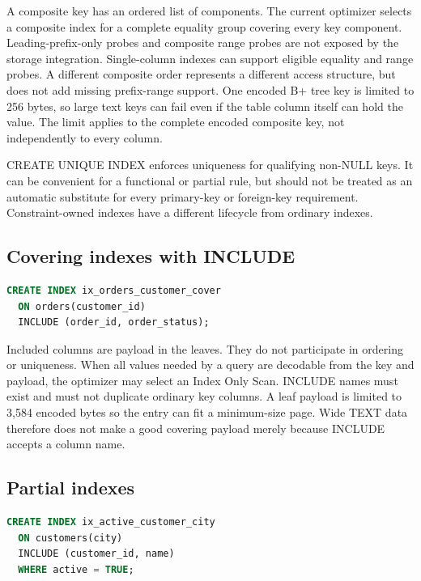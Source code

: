 A composite key has an ordered list of components. The current optimizer selects a composite index for a complete equality group covering every key component. Leading-prefix-only probes and composite range probes are not exposed by the storage integration. Single-column indexes can support eligible equality and range probes. A different composite order represents a different access structure, but does not add missing prefix-range support. One encoded B+ tree key is limited to 256 bytes, so large text keys can fail even if the table column itself can hold the value. The limit applies to the complete encoded composite key, not independently to every column.

CREATE UNIQUE INDEX enforces uniqueness for qualifying non-NULL keys. It can be convenient for a functional or partial rule, but should not be treated as an automatic substitute for every primary-key or foreign-key requirement. Constraint-owned indexes have a different lifecycle from ordinary indexes.

\subsection{Covering indexes with INCLUDE}

\begin{lstlisting}[language=SQL]
CREATE INDEX ix_orders_customer_cover
  ON orders(customer_id)
  INCLUDE (order_id, order_status);
\end{lstlisting}

Included columns are payload in the leaves. They do not participate in ordering or uniqueness. When all values needed by a query are decodable from the key and payload, the optimizer may select an Index Only Scan. INCLUDE names must exist and must not duplicate ordinary key columns. A leaf payload is limited to 3,584 encoded bytes so the entry can fit a minimum-size page. Wide TEXT data therefore does not make a good covering payload merely because INCLUDE accepts a column name.

\subsection{Partial indexes}

\begin{lstlisting}[language=SQL]
CREATE INDEX ix_active_customer_city
  ON customers(city)
  INCLUDE (customer_id, name)
  WHERE active = TRUE;
\end{lstlisting}

